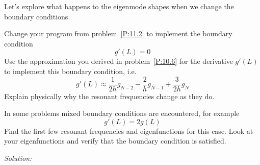 \begin{enumerate}
\prob Let's explore what happens to the eigenmode shapes when we
change the boundary conditions.
\begin{enumerate}
\subprob \label{P:11.3} Change your program
    from problem~\ref{P:11.2} to implement the boundary
    condition
    \[
        g'(L) = 0
    \]
    Use the approximation you derived in problem~\ref{P:10.6}
    for the derivative $g'(L)$ to implement this boundary
    condition, i.e.
    \[
        g'(L) \approx
        \frac{1}{2h} g_{N-2} - \frac{2}{h} g_{N-1} + \frac{3}{2h} g_N
    \]
    Explain physically why the resonant frequencies change as
    they do.

\subprob In some problems mixed boundary conditions are
    encountered, for example
    \[
        g'(L) = 2 g(L)
    \]
    Find the first few resonant frequencies and
    eigenfunctions for this case. Look at your eigenfunctions
    and verify that the boundary condition is satisfied.
\end{enumerate}
\end{enumerate}
\ifsolutions
\textit{Solution:}\\
